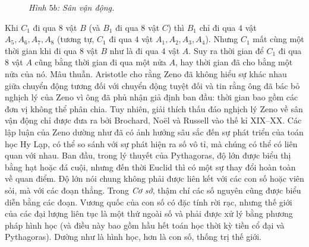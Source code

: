 \begin{multicols}{2}
\begin{figure}[H]
	\caption{\small\textit{\color{lichsutoanhoc}Hình $5b$: Sân vận động.}}
	\vspace*{-5pt}
	\end{figure}
	Khi $C_1$  đi qua $8$ vật $B$  (và $B_1$ đi qua 8 vật  $C$) thì $B_1$  chỉ đi qua $4$ vật $A_5, A_6, A_7, A_8$  (tương tự,  $C_1$  đi qua $4$ vật  $A_1, A_2, A_3, A_4$). Nhưng $C_1$  mất cùng một thời gian khi đi qua $8$ vật  $B$ như là đi qua $4$ vật $A$.  Suy ra thời gian để  $C_1$  đi qua $8$ vật $A$  cũng bằng thời gian đi qua một nửa $A$,  hay thời gian đã cho bằng một nửa của nó. Mâu thuẫn.     
	\vskip 0.1cm
	Aristotle cho rằng Zeno đã không hiểu sự khác nhau giữa chuyển động tương đối với chuyển động tuyệt đối và tin rằng ông đã bác bỏ nghịch lý của Zeno vì ông đã phủ nhận giả định ban đầu: thời gian bao gồm các đơn vị không thể phân chia. Tuy nhiên, giải thích thấu đáo nghịch lý Zeno về sân vận động chỉ được đưa ra bởi Brochard, Noël và Russell vào thế kỉ XIX--XX.
	\vskip 0.1cm 
	Các lập luận của Zeno dường như đã có ảnh hưởng sâu sắc đến sự phát triển của toán học Hy Lạp, có thể so sánh với sự phát hiện ra số vô tỉ, mà chúng có thể có liên quan với nhau. Ban đầu, trong lý thuyết của Pythagoras, độ lớn được biểu thị bằng hạt hoặc đá cuội, nhưng đến thời Euclid thì có một sự thay đổi hoàn toàn về quan điểm.  Độ lớn nói chung không phải được liên kết với các con số hoặc viên sỏi, mà với các đoạn thẳng. Trong \textit{Cơ sở}, thậm chí các số nguyên cũng được biểu diễn bằng các đoạn. Vương quốc của con số có đặc tính rời rạc, nhưng thế giới của các đại lượng liên tục là một thứ ngoài số và phải được xử lý bằng phương pháp hình học (và điều này bao gồm hầu hết toán học thời kỳ tiền cổ đại và Pythagoras).  Dường như là hình học, hơn là con số, thống trị thế giới.

\end{multicols}

